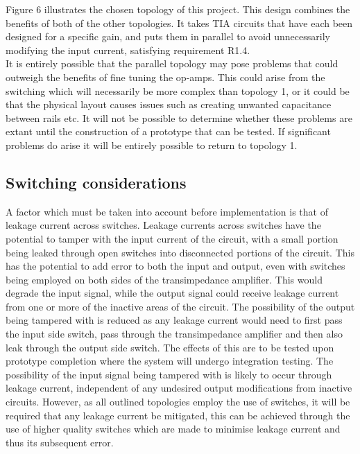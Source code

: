 \documentclass[conference]{IEEEtran}
\begin{document}
Figure 6 illustrates the chosen topology of this project. This design combines the benefits of both of the other topologies. It takes TIA circuits that have each been designed for a specific gain, and puts them in parallel to avoid unnecessarily modifying the input current, satisfying requirement R1.4. \\

It is entirely possible that the parallel topology may pose problems that could outweigh the benefits of fine tuning the op-amps. This could arise from the switching which will necessarily be more complex than topology 1, or it could be that the physical layout causes issues such as creating unwanted capacitance between rails etc. It will not be possible to determine whether these problems are extant until the construction of a prototype that can be tested. If significant problems do arise it will be entirely possible to return to topology 1.

\subsection{Switching considerations}

A factor which must be taken into account before implementation is that of leakage current across switches. Leakage currents across switches have the potential to tamper with the input current of the circuit, with a small portion being leaked through open switches into disconnected portions of the circuit. This has the potential to add error to both the input and output, even with switches being employed on both sides of the transimpedance amplifier. This would degrade the input signal, while the output signal could receive leakage current from one or more of the inactive areas of the circuit. The possibility of the output being tampered with is reduced as any leakage current would need to first pass the input side switch, pass through the transimpedance amplifier and then also leak through the output side switch. The effects of this are to be tested upon prototype completion where the system will undergo integration testing. The possibility of the input signal being tampered with is likely to occur through leakage current, independent of any undesired output modifications from inactive circuits. However, as all outlined topologies employ the use of switches, it will be required that any leakage current be mitigated, this can be achieved through the use of higher quality switches which are made to minimise leakage current and thus its subsequent error. \\
\end{document}
